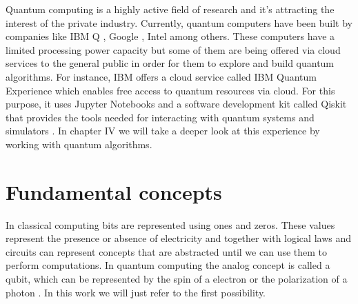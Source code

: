 \documentclass[12pt,a4paper]{scrartcl}
\begin{document}
Quantum computing is a highly active field of research and it’s attracting the interest of the private industry. Currently, quantum computers have been built by companies like IBM Q \cite{ibm-q-e}, Google \cite{google-q}, Intel \cite{intel-q} among others. These computers have a limited processing power capacity but some of them are being offered via cloud services to the general public \cite{aws-braket}\cite{azure-q} in order for them to explore and build quantum algorithms. For instance, IBM offers a cloud service called IBM Quantum Experience \cite{ibm-q-e} which enables free access to quantum resources via cloud. For this purpose, it uses Jupyter Notebooks and a software development kit called Qiskit that provides the tools needed for interacting with quantum systems and simulators \cite{qiskit}.  In chapter IV we will take a deeper look at this experience by working with quantum algorithms. 



\section{Fundamental concepts}\label{s:fundamental_concepts}
In classical computing bits are represented using ones and zeros. These values represent the presence or absence of electricity and together with logical laws and circuits can represent concepts that are abstracted until we can use them to perform computations. In quantum computing the analog concept is called a qubit, which can be represented by the spin of a electron or the polarization of a photon \cite{bernhardt2019quantum}.  In this work we will just refer to the first possibility.
\end{document}
